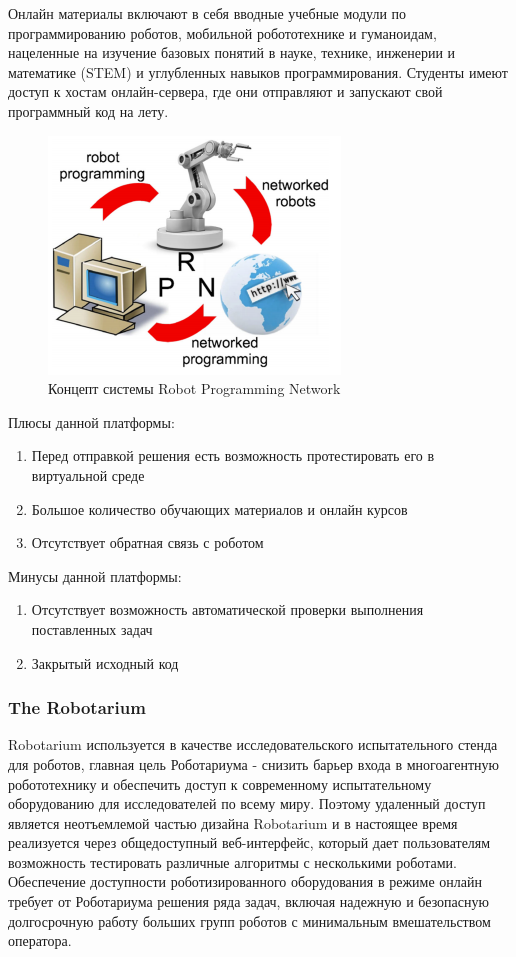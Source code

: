 \documentclass[a4paper,12pt]{article}
\begin{document}
Онлайн материалы включают в себя вводные учебные модули по программированию роботов, мобильной робототехнике и гуманоидам, нацеленные на изучение базовых понятий в науке, технике, инженерии и математике (STEM) и углубленных навыков программирования. Студенты имеют доступ к хостам онлайн-сервера, где они отправляют и запускают свой программный код на лету. \cite{web:rpn}

\begin{figure}[H]
    \centering
    \includegraphics{pictures/RPNConcept.png}
    \caption{Концепт системы Robot Programming Network}
    \label{fig:rpn_concept}
\end{figure}

Плюсы данной платформы:
\begin{enumerate}
    \item Перед отправкой решения есть возможность протестировать его в виртуальной среде
    \item Большое количество обучающих материалов и онлайн курсов
    \item Отсутствует обратная связь с роботом
\end{enumerate}

Минусы данной платформы:
\begin{enumerate}
    \item Отсутствует возможность автоматической проверки выполнения поставленных задач
    \item Закрытый исходный код
\end{enumerate}

\subsubsection{The Robotarium}
Robotarium используется в качестве исследовательского испытательного стенда для роботов, главная цель Роботариума - снизить барьер входа в многоагентную робототехнику и обеспечить доступ к современному испытательному оборудованию для исследователей по всему миру. Поэтому удаленный доступ является неотъемлемой частью дизайна Robotarium и в настоящее время реализуется через общедоступный веб-интерфейс, который дает пользователям возможность тестировать различные алгоритмы с несколькими роботами. Обеспечение доступности роботизированного оборудования в режиме онлайн требует от Роботариума решения ряда задач, включая надежную и безопасную долгосрочную работу больших групп роботов с минимальным вмешательством оператора.
\end{document}
